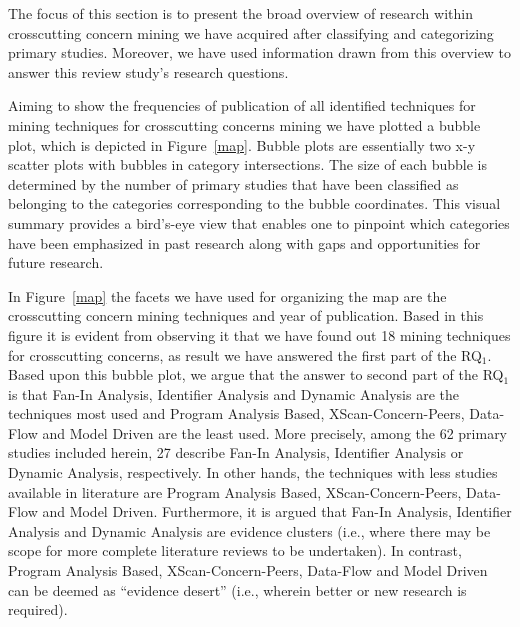 The focus of this section is to present the broad overview of research within crosscutting concern mining we have acquired after classifying and categorizing primary studies. Moreover, we have used information drawn from this overview to answer this review study's research questions.

Aiming to show the frequencies of publication of all identified techniques for mining techniques for crosscutting concerns mining we have plotted a bubble plot, which is depicted in Figure~\ref{map}. Bubble plots are essentially two x-y scatter plots with bubbles in category intersections. The size of each bubble is determined by the number of primary studies that have been classified as belonging to the categories corresponding to the bubble coordinates. This visual summary provides a bird's-eye view that enables one to pinpoint which categories have been emphasized in past research along with gaps and opportunities for future research. 

In Figure~\ref{map} the facets we have used for organizing the map are the crosscutting concern mining techniques and year of publication. Based in this figure it is evident from observing it that we have found out 18 mining techniques for crosscutting concerns, as result we have answered the first part of the RQ$_1$. Based upon this bubble plot, we argue that the answer to second part of the RQ$_1$ is that Fan-In Analysis, Identifier Analysis and Dynamic Analysis are the techniques most used and Program Analysis Based, XScan-Concern-Peers, Data-Flow and Model Driven are the least used. More precisely, among the 62 primary studies included herein, 27 describe Fan-In Analysis, Identifier Analysis or Dynamic Analysis, respectively. In other hands, the techniques with less studies available in literature are Program Analysis Based, XScan-Concern-Peers, Data-Flow and Model Driven. Furthermore, it is argued that Fan-In Analysis, Identifier Analysis and Dynamic Analysis are evidence clusters (i.e., where there may be scope for more complete literature reviews to be undertaken). In contrast, Program Analysis Based, XScan-Concern-Peers, Data-Flow and Model Driven can be deemed as ``evidence desert'' (i.e., wherein better or new research is required). 


